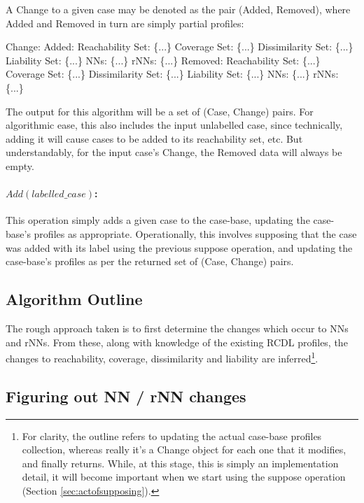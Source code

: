 \documentclass[a4paper,11pt]{report}
\begin{document}
A Change to a given case may be denoted as the pair (Added, Removed), where Added and Removed in turn are simply partial profiles:
\begin{code}[numbers=none,frame=none]
Change:
  Added:
    Reachability Set:  \{...\}
    Coverage Set:      \{...\}
    Dissimilarity Set: \{...\}
    Liability Set:     \{...\}
    NNs:               \{...\}
    rNNs:              \{...\}
  Removed:
    Reachability Set:  \{...\}
    Coverage Set:      \{...\}
    Dissimilarity Set: \{...\}
    Liability Set:     \{...\}
    NNs:               \{...\}
    rNNs:              \{...\}
\end{code}

The output for this algorithm will be a set of (Case, Change) pairs. For algorithmic ease, this also includes the input unlabelled case, since technically, adding it will cause cases to be added to its reachability set, etc. But understandably, for the input case's Change, the Removed data will always be empty.

\paragraph{$Add(labelled\_case)$:}
This operation simply adds a given case to the case-base, updating the case-base's profiles as appropriate. Operationally, this involves supposing that the case was added with its label using the previous suppose operation, and updating the case-base's profiles as per the returned set of (Case, Change) pairs.


\subsection{Algorithm Outline}
The rough approach taken is to first determine the changes which occur to NNs and rNNs. From these, along with knowledge of the existing RCDL profiles, the changes to reachability, coverage, dissimilarity and liability are inferred\footnote{For clarity, the outline refers to updating the actual case-base profiles collection, whereas really it's a Change object for each one that it modifies, and finally returns. While, at this stage, this is simply an implementation detail, it will become important when we start using the suppose operation (Section \ref{sec:actofsupposing}).}.

\subsection{Figuring out NN / rNN changes}
\end{document}
